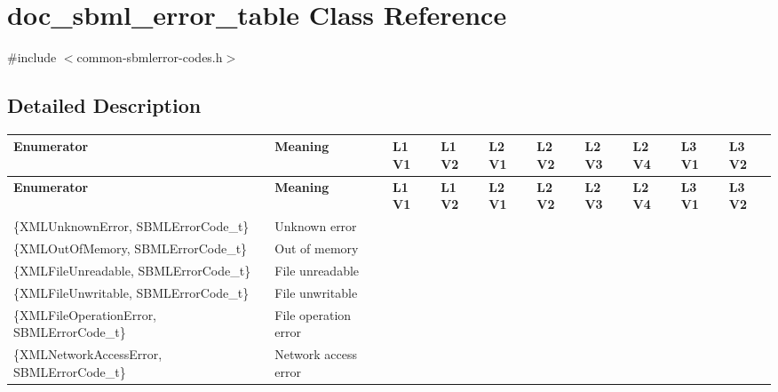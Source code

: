 \hypertarget{classdoc__sbml__error__table}{}\section{doc\+\_\+sbml\+\_\+error\+\_\+table Class Reference}
\label{classdoc__sbml__error__table}


{\ttfamily \#include $<$common-\/sbmlerror-\/codes.\+h$>$}



\subsection{Detailed Description}
\begin{DoxyParagraph}{}
\tabulinesep=1mm
\begin{longtabu} spread 0pt [c]{*{10}{|X[-1]}|}
\hline
\rowcolor{\tableheadbgcolor}\textbf{ {\bfseries Enumerator} }&\textbf{ {\bfseries Meaning} }&\PBS\centering \textbf{ L1 V1 }&\PBS\centering \textbf{ L1 V2 }&\PBS\centering \textbf{ L2 V1 }&\PBS\centering \textbf{ L2 V2 }&\PBS\centering \textbf{ L2 V3 }&\PBS\centering \textbf{ L2 V4 }&\PBS\centering \textbf{ L3 V1 }&\PBS\centering \textbf{ L3 V2  }\\
\endfirsthead
\hline
\endfoot
\hline
\rowcolor{\tableheadbgcolor}\textbf{ {\bfseries Enumerator} }&\textbf{ {\bfseries Meaning} }&\PBS\centering \textbf{ L1 V1 }&\PBS\centering \textbf{ L1 V2 }&\PBS\centering \textbf{ L2 V1 }&\PBS\centering \textbf{ L2 V2 }&\PBS\centering \textbf{ L2 V3 }&\PBS\centering \textbf{ L2 V4 }&\PBS\centering \textbf{ L3 V1 }&\PBS\centering \textbf{ L3 V2  }\\
\endhead
\{X\+M\+L\+Unknown\+Error, S\+B\+M\+L\+Error\+Code\+\_\+t\} &Unknown error &&&&&&&&\\
\{X\+M\+L\+Out\+Of\+Memory, S\+B\+M\+L\+Error\+Code\+\_\+t\} &Out of memory &&&&&&&&\\
\{X\+M\+L\+File\+Unreadable, S\+B\+M\+L\+Error\+Code\+\_\+t\} &File unreadable &&&&&&&&\\
\{X\+M\+L\+File\+Unwritable, S\+B\+M\+L\+Error\+Code\+\_\+t\} &File unwritable &&&&&&&&\\
\{X\+M\+L\+File\+Operation\+Error, S\+B\+M\+L\+Error\+Code\+\_\+t\} &File operation error &&&&&&&&\\
\{X\+M\+L\+Network\+Access\+Error, S\+B\+M\+L\+Error\+Code\+\_\+t\} &Network access error &&&&&&&&\\

\end{longtabu}
\end{DoxyParagraph}
